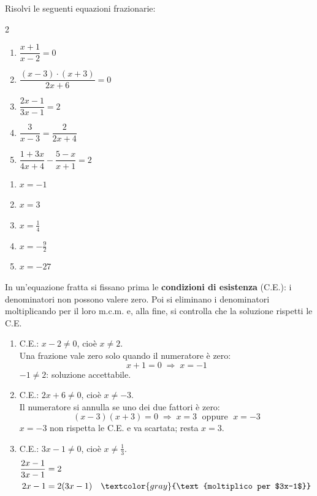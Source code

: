 \begin{question}[ID=3.1, subtitle={Equazioni frazionarie}, difficulty=facile, tags={equazioni frazionarie}]
Risolvi le seguenti equazioni frazionarie:
\begin{multicols}{2}
\begin{enumerate}[leftmargin=3cm]
    \item $\dfrac{x+1}{x-2} = 0$
    \item $\dfrac{(x-3) \cdot (x+3)}{2x+6} = 0$
    \item $\dfrac{2x-1}{3x-1} = 2$
    \item $\dfrac{3}{x-3} = \dfrac{2}{2x+4}$
    \item $\dfrac{1+3x}{4x+4} - \dfrac{5-x}{x+1} = 2$
\end{enumerate}
\end{multicols}
\begin{solution}
\begin{enumerate}
    \item $x=-1$
    \item $x=3$
    \item $x=\tfrac14$
    \item $x=-\tfrac92$
    \item $x=-27$
\end{enumerate}
\end{solution}
\begin{explanation}
In un'equazione fratta si fissano prima le \textbf{condizioni di esistenza} (C.E.): i denominatori non possono valere zero. Poi si eliminano i denominatori moltiplicando per il loro m.c.m. e, alla fine, si controlla che la soluzione rispetti le C.E.
\begin{enumerate}
    \item C.E.: $x-2\neq0$, cioè $x\neq2$. \\
    Una frazione vale zero solo quando il numeratore è zero:
    \[ x+1=0 \;\Rightarrow\; x=-1 \]
    $-1\neq2$: soluzione accettabile.
    \item C.E.: $2x+6\neq0$, cioè $x\neq-3$. \\
    Il numeratore si annulla se uno dei due fattori è zero:
    \[ (x-3)(x+3)=0 \;\Rightarrow\; x=3 \;\text{ oppure }\; x=-3 \]
    $x=-3$ non rispetta le C.E. e va scartata; resta $x=3$.
    \item C.E.: $3x-1\neq0$, cioè $x\neq\tfrac13$.
    \[\begin{aligned}
    \dfrac{2x-1}{3x-1} &= 2\\
    2x-1 &= 2(3x-1) && \textcolor{gray}{\text{moltiplico per $3x-1$}}\\

\end{aligned}\]
\end{enumerate}
\end{explanation}
\end{question}
